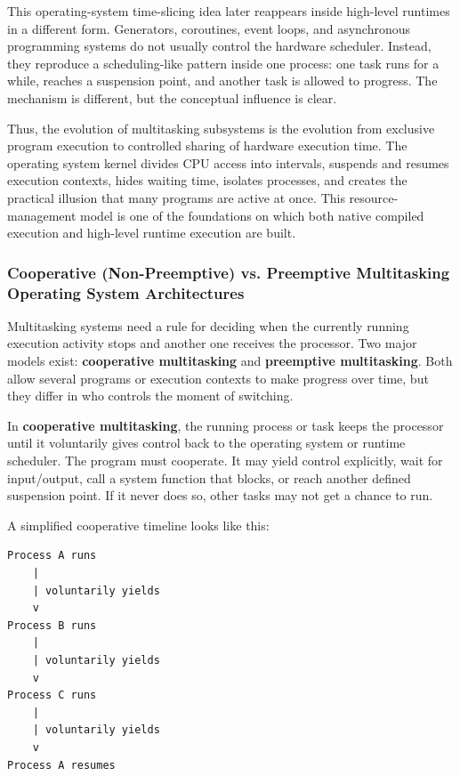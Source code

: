 This operating-system time-slicing idea later reappears inside high-level runtimes in a different form. Generators, coroutines, event loops, and asynchronous programming systems do not usually control the hardware scheduler. Instead, they reproduce a scheduling-like pattern inside one process: one task runs for a while, reaches a suspension point, and another task is allowed to progress. The mechanism is different, but the conceptual influence is clear.

Thus, the evolution of multitasking subsystems is the evolution from exclusive program execution to controlled sharing of hardware execution time. The operating system kernel divides CPU access into intervals, suspends and resumes execution contexts, hides waiting time, isolates processes, and creates the practical illusion that many programs are active at once. This resource-management model is one of the foundations on which both native compiled execution and high-level runtime execution are built.


\subsubsection{Cooperative (Non-Preemptive) vs. Preemptive Multitasking Operating System Architectures}

Multitasking systems need a rule for deciding when the currently running execution activity stops and another one receives the processor. Two major models exist: \textbf{cooperative multitasking} and \textbf{preemptive multitasking}. Both allow several programs or execution contexts to make progress over time, but they differ in who controls the moment of switching.

In \textbf{cooperative multitasking}, the running process or task keeps the processor until it voluntarily gives control back to the operating system or runtime scheduler. The program must cooperate. It may yield control explicitly, wait for input/output, call a system function that blocks, or reach another defined suspension point. If it never does so, other tasks may not get a chance to run.

A simplified cooperative timeline looks like this:

\begin{verbatim}
Process A runs
    |
    | voluntarily yields
    v
Process B runs
    |
    | voluntarily yields
    v
Process C runs
    |
    | voluntarily yields
    v
Process A resumes
\end{verbatim}

